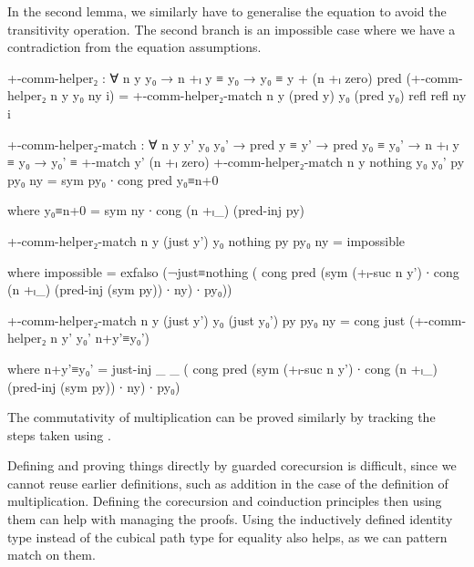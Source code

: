 In the second lemma, we similarly have to generalise the equation to avoid the
transitivity operation. The second branch is an impossible case where we have a
contradiction from the equation assumptions.
\begin{AgdaSuppressSpace}
\begin{code}
  +-comm-helper₂ :
    ∀ n y y₀ → n +ₗ y ≡ y₀ → y₀ ≡ y + (n +ₗ zero)
  pred (+-comm-helper₂ n y y₀ ny i) =
    +-comm-helper₂-match
      n y (pred y) y₀ (pred y₀) refl refl ny i

  +-comm-helper₂-match :
    ∀ n y y' y₀ y₀' →
    pred y ≡ y' → pred y₀ ≡ y₀' → n +ₗ y ≡ y₀ →
    y₀' ≡ +-match y' (n +ₗ zero)
  +-comm-helper₂-match n y nothing y₀ y₀' py py₀ ny =
    sym py₀ ∙ cong pred y₀≡n+0
\end{code}
\begin{code}[hide]
    where
    y₀≡n+0 = sym ny ∙ cong (n +ₗ_) (pred-inj py)
\end{code}
\begin{code}
  +-comm-helper₂-match n y (just y') y₀ nothing py py₀ ny
    = impossible
\end{code}
\begin{code}[hide]
    where
    impossible =
      exfalso
        (¬just≡nothing
          ( cong pred
              (sym (+ₗ-suc n y') ∙ cong (n +ₗ_) (pred-inj (sym py)) ∙ ny) ∙
            py₀))
\end{code}
\begin{code}
  +-comm-helper₂-match n y (just y') y₀ (just y₀') py py₀ ny
    = cong just (+-comm-helper₂ n y' y₀' n+y'≡y₀')
\end{code}
\begin{code}[hide]
    where
    n+y'≡y₀' =
      just-inj _ _
        ( cong pred
            (sym (+ₗ-suc n y') ∙ cong (n +ₗ_) (pred-inj (sym py)) ∙ ny) ∙
          py₀)
\end{code}
\end{AgdaSuppressSpace}

The commutativity of multiplication can be proved similarly by tracking the
steps taken using .

Defining and proving things directly by guarded corecursion is difficult, since
we cannot reuse earlier definitions, such as addition in the case of the
definition of multiplication. Defining the corecursion and coinduction
principles then using them can help with managing the proofs. Using the
inductively defined identity type instead of the cubical path type for equality
also helps, as we can pattern match on them.
